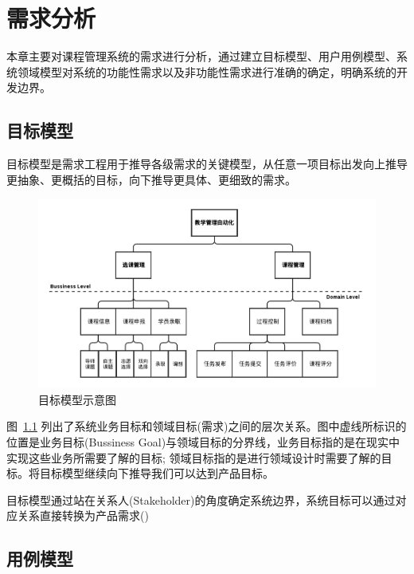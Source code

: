 \chapter{需求分析}

本章主要对课程管理系统的需求进行分析，通过建立目标模型、用户用例模型、系统领域模型对系统的功能性需求以及非功能性需求进行准确的确定，明确系统的开发边界。

\section{目标模型}

目标模型是需求工程用于推导各级需求的关键模型，从任意一项目标出发向上推导更抽象、更概括的目标，向下推导更具体、更细致的需求。

\begin{figure}[!hbp]
  \begin{center}
    \includegraphics[scale=0.5]{figures/diagram-goal-model.png}
    \caption{目标模型示意图\label{GoalModel}}
  \end{center}
\end{figure}

图~\ref{GoalModel} 列出了系统业务目标和领域目标(需求)之间的层次关系。图中虚线所标识的位置是业务目标(Bussiness Goal)与领域目标的分界线，业务目标指的是在现实中实现这些业务所需要了解的目标; 领域目标指的是进行领域设计时需要了解的目标。将目标模型继续向下推导我们可以达到产品目标。

目标模型通过站在关系人(Stakeholder)的角度确定系统边界，系统目标可以通过对应关系直接转换为产品需求()

\section{用例模型}

